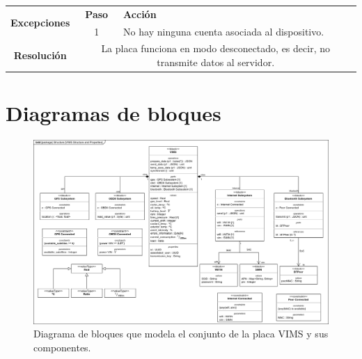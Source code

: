 \begin{table}[H]
\begin{tabularx}{\textwidth}{|c|c|X|}
    \hline
    \multirow{2}{*}{\textbf{Excepciones}}      & \textbf{Paso}                                                                                                                       & \textbf{Acción}                                                                                                                         \\
    \cline{2-3}
                                               & 1                                                                                                                                   & \multicolumn{1}{L|}{No hay ninguna cuenta asociada al dispositivo.}                                                                     \\
    \hline\hline
    \textbf{Resolución}                        & \multicolumn{2}{X|}{La placa funciona en modo desconectado, es decir, no transmite datos al servidor.}                                                                                                                                                      \\
    \hline
  \end{tabularx}
\end{table}

\section{Diagramas de bloques}
\begin{figure}[H]
  \centering
  \includegraphics[width=\linewidth]{images/BlockDiagrams-VIMS.drawio.png}
  \caption{Diagrama de bloques que modela el conjunto de la placa \ac{VIMS} y sus componentes.}
  \label{bd:vims}
\end{figure}

